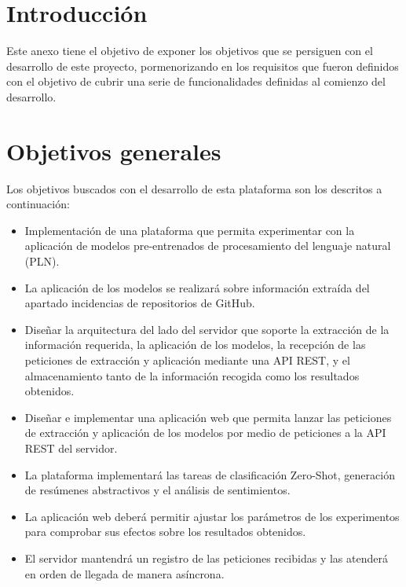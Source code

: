 
\section{Introducción}

Este anexo tiene el objetivo de exponer los objetivos que se persiguen con el desarrollo de este proyecto, pormenorizando en los requisitos que fueron definidos con el objetivo de cubrir una serie de funcionalidades definidas al comienzo del desarrollo.

\section{Objetivos generales}

Los objetivos buscados con el desarrollo de esta plataforma son los descritos a continuación:

\begin{itemize} [\textbullet] \setlength\itemsep{0.2em}
    \item Implementación de una plataforma que permita experimentar con la aplicación de modelos pre-entrenados de procesamiento del lenguaje natural (PLN).
    \item La aplicación de los modelos se realizará sobre información extraída del apartado incidencias de repositorios de GitHub.
    \item Diseñar la arquitectura del lado del servidor que soporte la extracción de la información requerida, la aplicación de los modelos, la recepción de las peticiones de extracción y aplicación mediante una API REST, y el almacenamiento tanto de la información recogida como los resultados obtenidos.
    \item Diseñar e implementar una aplicación web que permita lanzar las peticiones de extracción y aplicación de los modelos por medio de peticiones a la API REST del servidor.
    \item La plataforma implementará las tareas de clasificación Zero-Shot, generación de resúmenes abstractivos y el análisis de sentimientos.
    \item La aplicación web deberá permitir ajustar los parámetros de los experimentos para comprobar sus efectos sobre los resultados obtenidos.
    \item El servidor mantendrá un registro de las peticiones recibidas y las atenderá en orden de llegada de manera asíncrona.
\end{itemize}

